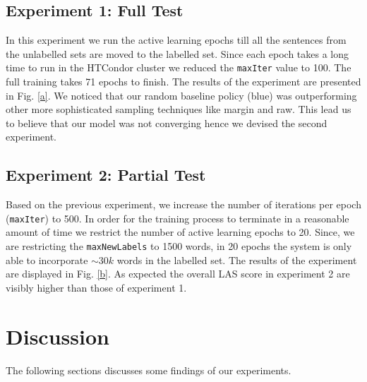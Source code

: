 \documentclass[11pt,letterpaper]{article}
\newcommand{\code}[1]{\small \texttt{#1}}
\begin{document}
 \subsection{Experiment 1: Full Test}
 In this experiment we run the active learning epochs till all the sentences from the unlabelled sets are moved to the labelled set. Since each epoch takes a long time to run in the HTCondor cluster we reduced the \code{maxIter} value to 100. The full training takes 71 epochs to finish. The results of the experiment are presented in Fig. \ref{a}. We noticed that our random baseline policy (blue) was outperforming other more sophisticated sampling techniques like margin and raw. This lead us to believe that our model was not converging hence we devised the second experiment.
 
 \subsection{Experiment 2: Partial Test}
 Based on the previous experiment, we increase the number of iterations per epoch (\code{maxIter}) to 500. In order for the training process to terminate in a reasonable amount of time we restrict the number of active learning epochs to 20. Since, we are restricting the \code{maxNewLabels} to 1500 words, in 20 epochs the system is only able to incorporate $\sim30k$ words in the labelled set. The results of the experiment are displayed in Fig. \ref{b}. As expected the overall LAS score in experiment 2 are visibly higher than those of experiment 1.
 
\section{Discussion}
The following sections discusses some findings of our experiments.
 
\end{document}
